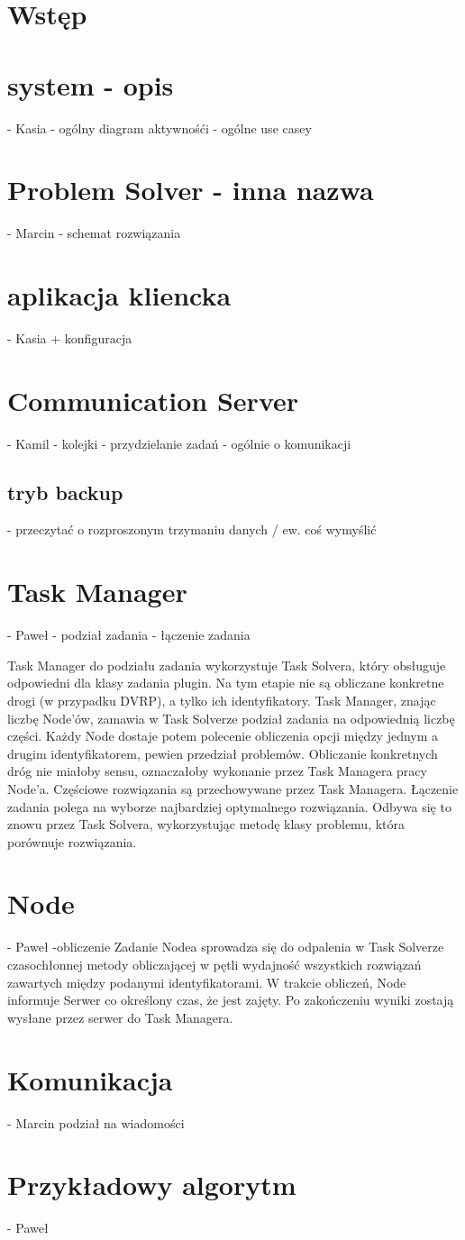 \documentclass{book}
\begin{document}
\tableofcontents


	\chapter{Wstęp}
	\chapter{system - opis} - Kasia
		- ogólny diagram aktywnośći 
		- ogólne use casey
	\chapter{Problem Solver - inna nazwa} - Marcin
		- schemat rozwiązania
	\chapter{aplikacja kliencka} - Kasia
		+ konfiguracja	
	\chapter{Communication Server} - Kamil
		- kolejki
		- przydzielanie zadań
		- ogólnie o komunikacji
		\section{tryb backup}
			- przeczytać o rozproszonym trzymaniu danych / ew. coś wymyślić
	\chapter{Task Manager} - Paweł
		- podział zadania 
		- łączenie zadania
		
		Task Manager do podziału zadania wykorzystuje Task Solvera, który obsługuje odpowiedni dla klasy zadania plugin. Na tym etapie nie są obliczane konkretne drogi (w przypadku DVRP), a tylko ich identyfikatory. Task Manager, znając liczbę Node'ów, zamawia w Task Solverze podział zadania na odpowiednią liczbę części. Każdy Node dostaje potem polecenie obliczenia opcji między jednym a drugim identyfikatorem, pewien przedział problemów. Obliczanie konkretnych dróg nie miałoby sensu, oznaczałoby wykonanie przez Task Managera pracy Node'a.
		Częściowe rozwiązania są przechowywane przez Task Managera. Łączenie zadania polega na wyborze najbardziej optymalnego rozwiązania. Odbywa się to znowu przez Task Solvera, wykorzystując metodę klasy problemu, która porównuje rozwiązania.
	\chapter{Node} - Paweł
		-obliczenie
		Zadanie Nodea sprowadza się do odpalenia w Task Solverze czasochłonnej metody obliczającej w pętli wydajność wszystkich rozwiązań zawartych między podanymi identyfikatorami. W trakcie obliczeń, Node informuje Serwer co określony czas, że jest zajęty. Po zakończeniu wyniki zostają wysłane przez serwer do Task Managera.
	\chapter{Komunikacja} - Marcin
		podział na wiadomości
	\chapter{Przykładowy algorytm} - Paweł
\end{document}
